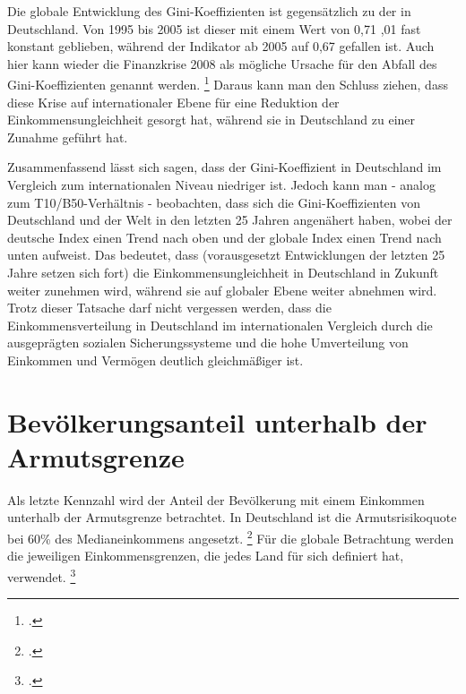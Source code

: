 Die globale Entwicklung des Gini-Koeffizienten ist gegensätzlich zu der in Deutschland. Von 1995 bis 2005 ist dieser mit einem Wert von 0,71 ,01 fast konstant geblieben, während der Indikator ab 2005 auf 0,67 gefallen ist. Auch hier kann wieder die Finanzkrise 2008 als mögliche Ursache für den Abfall des Gini-Koeffizienten genannt werden. \footcite[Vgl. ][S. 55]{wir_2022} Daraus kann man den Schluss ziehen, dass diese Krise auf internationaler Ebene für eine Reduktion der Einkommensungleichheit gesorgt hat, während sie in Deutschland zu einer Zunahme geführt hat.

Zusammenfassend lässt sich sagen, dass der Gini-Koeffizient in Deutschland im Vergleich zum internationalen Niveau niedriger ist. Jedoch kann man - analog zum T10/B50-Verhältnis - beobachten, dass sich die Gini-Koeffizienten von Deutschland und der Welt in den letzten 25 Jahren angenähert haben, wobei der deutsche Index einen Trend nach oben und der globale Index einen Trend nach unten aufweist. Das bedeutet, dass (vorausgesetzt Entwicklungen der letzten 25 Jahre setzen sich fort) die Einkommensungleichheit in Deutschland in Zukunft weiter zunehmen wird, während sie auf globaler Ebene weiter abnehmen wird. Trotz dieser Tatsache darf nicht vergessen werden, dass die Einkommensverteilung in Deutschland im internationalen Vergleich durch \zB die ausgeprägten sozialen Sicherungssysteme und die hohe Umverteilung von Einkommen und Vermögen deutlich gleichmä{\ss}iger ist.

\section{Bevölkerungsanteil unterhalb der Armutsgrenze}

Als letzte Kennzahl wird der Anteil der Bevölkerung mit einem Einkommen unterhalb der Armutsgrenze betrachtet. In Deutschland ist die Armutsrisikoquote bei 60\% des Medianeinkommens angesetzt. \footcite[Vgl.][]{bmas_arb_armutsrisikoquote_2023} Für die globale Betrachtung werden die jeweiligen Einkommensgrenzen, die jedes Land für sich definiert hat, verwendet. \footcite[Vgl.][]{wb_armutsquote_global_2022}


